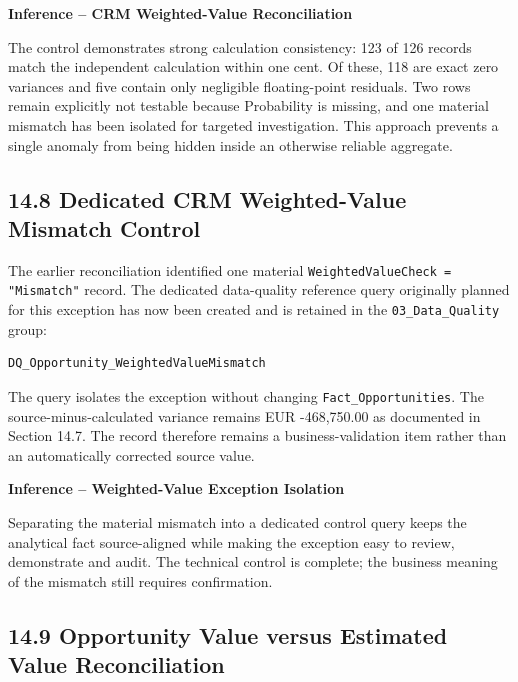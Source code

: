 \documentclass[11pt,a4paper]{article}
\begin{document}
\begin{inferencebox}

\textbf{Inference -- CRM Weighted-Value Reconciliation}

The control demonstrates strong calculation consistency: 123 of 126 records
match the independent calculation within one cent. Of these, 118 are exact zero
variances and five contain only negligible floating-point residuals. Two rows
remain explicitly not testable because Probability is missing, and one material
mismatch has been isolated for targeted investigation. This approach prevents a
single anomaly from being hidden inside an otherwise reliable aggregate.

\end{inferencebox}

\subsection{14.8 Dedicated CRM Weighted-Value Mismatch Control}

The earlier reconciliation identified one material
\texttt{WeightedValueCheck = "Mismatch"} record. The dedicated data-quality
reference query originally planned for this exception has now been created and is
retained in the \texttt{03\_Data\_Quality} group:

\begin{lstlisting}[style=powerquery]
DQ_Opportunity_WeightedValueMismatch
\end{lstlisting}

The query isolates the exception without changing
\texttt{Fact\_Opportunities}. The source-minus-calculated variance remains
EUR -468,750.00 as documented in Section 14.7. The record therefore remains a
business-validation item rather than an automatically corrected source value.

\begin{inferencebox}

\textbf{Inference -- Weighted-Value Exception Isolation}

Separating the material mismatch into a dedicated control query keeps the
analytical fact source-aligned while making the exception easy to review,
demonstrate and audit. The technical control is complete; the business meaning
of the mismatch still requires confirmation.

\end{inferencebox}

\subsection{14.9 Opportunity Value versus Estimated Value Reconciliation}
\end{document}
